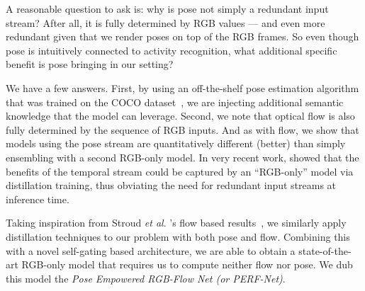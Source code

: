 \documentclass[letterpaper]{article} \usepackage{aaai21}  \usepackage{times}  \usepackage{helvet} \usepackage{courier}  \usepackage[hyphens]{url}  \usepackage{graphicx} \urlstyle{rm} \def\UrlFont{\rm}  \usepackage{natbib}  \usepackage{caption} \frenchspacing  \setlength{\pdfpagewidth}{8.5in}  \setlength{\pdfpageheight}{11in}
\def\etal{\emph{et al}. }
\begin{document}
A reasonable question to ask is: why is pose not simply a redundant input stream? After all, it is fully determined by RGB values --- and even more redundant given that we render poses on top of the RGB frames. So even though pose is intuitively connected to activity recognition, what additional specific benefit is pose bringing in our setting?  

We have a few answers.  First, by using an off-the-shelf pose estimation algorithm that was trained on the COCO dataset~\cite{lin2014microsoft}, we are injecting additional semantic knowledge that the model can leverage.  Second, we note that optical flow is also fully determined by the sequence of RGB inputs. And as with flow, we show that models using the pose stream are quantitatively different (better) than simply ensembling with a second RGB-only model.  In very recent work, \citet{stroud2020d3d} showed that the benefits of the temporal stream could be captured by an “RGB-only” model via distillation training, thus obviating the need for redundant input streams at inference time.  

Taking inspiration from Stroud \etal’s flow based results~\cite{stroud2020d3d}, we similarly apply distillation techniques to our problem with both pose and flow.  Combining this with a novel self-gating based architecture, we are able to obtain a state-of-the-art RGB-only model that requires us to compute neither flow nor pose. We dub this model the \emph{Pose Empowered RGB-Flow Net (or PERF-Net)}.
\end{document}
